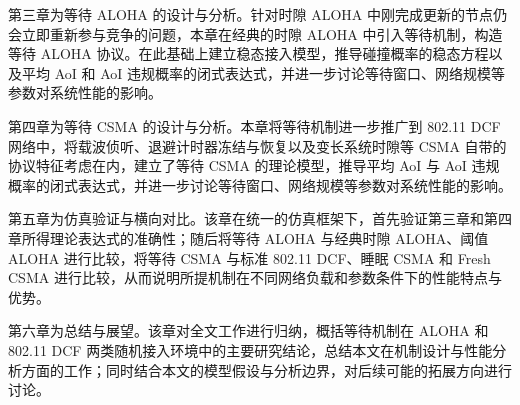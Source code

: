 第三章为等待 ALOHA 的设计与分析。针对时隙 ALOHA 中刚完成更新的节点仍会立即重新参与竞争的问题，本章在经典的时隙 ALOHA 中引入等待机制，构造等待 ALOHA 协议。在此基础上建立稳态接入模型，推导碰撞概率的稳态方程以及平均 AoI 和 AoI 违规概率的闭式表达式，并进一步讨论等待窗口、网络规模等参数对系统性能的影响。

第四章为等待 CSMA 的设计与分析。本章将等待机制进一步推广到 802.11 DCF 网络中，将载波侦听、退避计时器冻结与恢复以及变长系统时隙等 CSMA 自带的协议特征考虑在内，建立了等待 CSMA 的理论模型，推导平均 AoI 与 AoI 违规概率的闭式表达式，并进一步讨论等待窗口、网络规模等参数对系统性能的影响。

第五章为仿真验证与横向对比。该章在统一的仿真框架下，首先验证第三章和第四章所得理论表达式的准确性；随后将等待 ALOHA 与经典时隙 ALOHA、阈值 ALOHA 进行比较，将等待 CSMA 与标准 802.11 DCF、睡眠 CSMA 和 Fresh CSMA 进行比较，从而说明所提机制在不同网络负载和参数条件下的性能特点与优势。

第六章为总结与展望。该章对全文工作进行归纳，概括等待机制在 ALOHA 和 802.11 DCF 两类随机接入环境中的主要研究结论，总结本文在机制设计与性能分析方面的工作；同时结合本文的模型假设与分析边界，对后续可能的拓展方向进行讨论。
